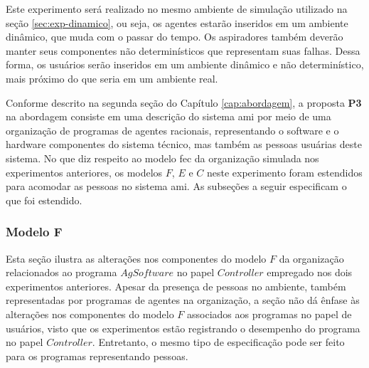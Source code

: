 \begin{figure}[h!]
    \centering
\end{figure}

Este experimento será realizado no mesmo ambiente de simulação utilizado na seção \ref{sec:exp-dinamico}, ou seja, os agentes estarão inseridos em um ambiente dinâmico, que muda com o passar do tempo. Os aspiradores também deverão manter seus componentes não determinísticos que representam suas falhas. Dessa forma, os usuários serão inseridos em um ambiente dinâmico e não determinístico, mais próximo do que seria em um ambiente real. 

Conforme descrito na segunda seção do Capítulo \ref{cap:abordagem}, a proposta \textbf{P3} na abordagem consiste em uma descrição do sistema \acrshort{ami} por meio de uma organização de programas de agentes racionais, representando o software e o hardware componentes do sistema técnico, mas também as pessoas usuárias deste sistema. No que diz respeito ao modelo \acrshort{fec} da organização simulada nos experimentos anteriores, os modelos $F$, $E$ e $C$ neste experimento foram estendidos para acomodar as pessoas no sistema \acrshort{ami}. As subseções a seguir especificam o que foi estendido. 

\subsubsection{Modelo F}

Esta seção ilustra as alterações nos componentes do modelo $F$ da organização relacionados ao programa $AgSoftware$ no papel $Controller$ empregado nos dois experimentos anteriores. Apesar da presença de pessoas no ambiente, também representadas por programas de agentes na organização, a seção não dá ênfase às alterações nos componentes do modelo $F$ associados aos programas no papel de usuários, visto que os experimentos estão registrando o desempenho do programa no papel $Controller$. Entretanto, o mesmo tipo de especificação pode ser feito para os programas representando pessoas.

